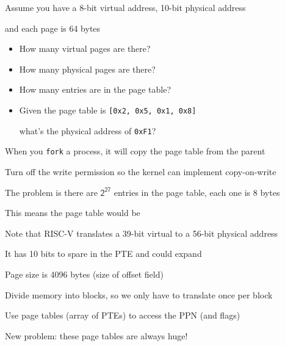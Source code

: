 \begin{slide}


    Assume you have a 8-bit virtual address, 10-bit physical address

    \leftspace{}and each page is 64 bytes
    \medskip

    \begin{itemize}
      \item How many virtual pages are there? 
      \item How many physical pages are there? 
      \item How many entries are in the page table? 
      \item Given the page table is \texttt{{[0x2, 0x5, 0x1, 0x8]}}

            \hspace{2em} what's the physical address of \texttt{0xF1}?

    \end{itemize}

\end{slide}


\begin{slide}


    When you \texttt{fork} a process, it will copy the page table from the parent

    \leftspace{}Turn off the write permission so the kernel can implement
    copy-on-write
    \medskip

    The problem is there are $\mathsf{2^{27}}$ entries in the page table, each
    one is 8 bytes

    \leftspace{}This means the page table would be 
    \medskip

    Note that RISC-V translates a 39-bit virtual to a 56-bit physical address

    \leftspace{}It has 10 bits to spare in the PTE and could expand

    \leftspace{}Page size is 4096 bytes (size of offset field)

\end{slide}

\begin{slide}


    Divide memory into blocks, so we only have to translate once per block
    \medskip

    Use page tables (array of PTEs) to access the PPN (and flags)
    \medskip

    New problem: these page tables are always huge!

\end{slide}


